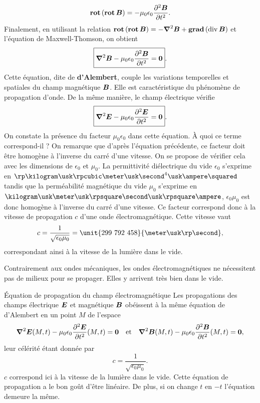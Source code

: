 \begin{equation*}
	\rot(\rot \vecb) = -\mu_0 \epsilon_0 \dd{^2\vecb}{t^2}.
\end{equation*}
Finalement, en utilisant la relation $\rot(\rot \vecb) = - \laplacien \vecb 
+ \gradient(\div \vecb)$ et l'équation de Maxwell-Thomson, on obtient
\begin{equation*}
	\boxed{\laplacien \vecb - \mu_0 \epsilon_0 \dd{^2\vecb}{t^2} = \mathbf{0}}.
\end{equation*}
Cette équation, dite de \textbf{d'Alembert}, couple les variations temporelles
et spatiales du champ magnétique $\vecb$. Elle est caractéristique du phénomène
de propagation d'onde. De la même manière, le champ électrique vérifie
\begin{equation*}
	\boxed{\laplacien \vece - \mu_0 \epsilon_0 \dd{^2\vece}{t^2} = \mathbf{0}}.
\end{equation*}
On constate la présence du facteur $\mu_0 \epsilon_0$ dans cette équation. 
À quoi ce terme correspond-il ? On remarque que d'après l'équation précédente, ce 
facteur doit être homogène à l'inverse du carré d'une vitesse. 
On se propose de vérifier cela avec les dimensions de $\epsilon_0$ 
et $\mu_0$. La permittivité diélectrique du vide $\epsilon_0$ s'exprime en 
$\rp \kilogram \usk \rpcubic \meter \usk \second^4 \usk \ampere \squared$ 
tandis que la perméabilité magnétique du vide $\mu_0$ s'exprime en 
$\kilogram \usk \meter \usk \rpsquare \second \usk \rpsquare \ampere$, 
$\epsilon_0 \mu_0$ est donc homogène à l'inverse du carré d'une vitesse. Ce facteur
correspond donc à la vitesse de propagation $c$ d'une onde électromagnétique. 
Cette vitesse vaut
\begin{equation*}
	c = \dfrac{1}{\sqrt{\epsilon_0 \mu_0}} = \unit{299\ 792\ 458}{\meter 
	\usk \rp \second},
\end{equation*}
correspondant ainsi à la vitesse de la lumière dans le vide.

\begin{rema}
	Contrairement aux ondes mécaniques, les ondes électromagnétiques ne
	nécessitent pas de milieux pour se propager. Elles y arrivent très bien
	dans le vide.
\end{rema}

\begin{defn}{Équation de propagation du champ électromagnétique}
	Les propagations des champs électrique $\vece$ et magnétique $\vecb$ obéissent 
	à la même équation de d'Alembert en un point $M$ de l'espace
	\begin{equation}
	\laplacien \vece(M, t) - \mu_0 \epsilon_0 \dd{^2\vece}{t^2}(M, t) = \mathbf{0}
	\quad \mathrm{et} \quad
	\laplacien \vecb(M, t) - \mu_0 \epsilon_0 \dd{^2\vecb}{t^2}(M, t) = \mathbf{0},
	\end{equation}
	leur célérité étant donnée par 
	\begin{equation*}
		c = \dfrac{1}{\sqrt{\epsilon_0 \mu_0}}.
	\end{equation*}
	$c$ correspond ici à la vitesse de la lumière dans le vide. Cette équation
	de propagation a le bon goût d'être linéaire. De plus, si on change $t$
	en $-t$ l'équation demeure la même.
\end{defn}


